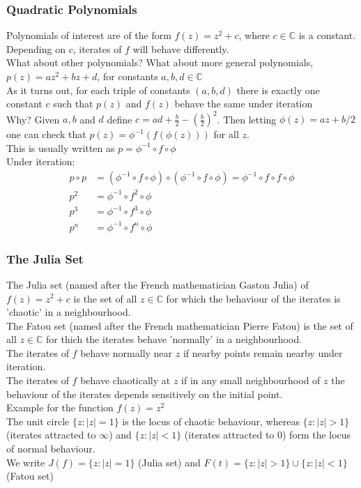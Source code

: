 \documentclass{article}
\begin{document}
\subsubsection{Quadratic Polynomials}
Polynomials of interest are of the form $f(z) = z^2 + c$, where $c \in \mathbb{C}$ is a constant. Depending on $c$, iterates of $f$ will behave differently.\\
What about other polynomials? What about more general polynomials, $p(z) = az^2 + bz + d$, for constants $a, b, d \in \mathbb{C}$\\
As it turns out, for each triple of constants $(a, b, d)$ there is exactly one constant $c$ such that $p(z)$ and $f(z)$ behave the same under iteration\\
Why? Given $a,b$ and $d$ define $c = ad + \frac{b}{2} - (\frac{b}{2})^2$. Then letting $\phi (z) = az + b/2$ one can check that $p(z) = \phi ^{-1}(f(\phi (z)))$ for all $z$.\\
This is usually written as $p = \phi ^{-1} \circ f \circ \phi$\\
Under iteration:
\begin{align*}
p \circ p &= (\phi ^{-1} \circ f \circ \phi ) \circ (\phi ^{-1} \circ f \circ \phi ) = \phi ^{-1} \circ f \circ f \circ \phi \\
p^2 & = \phi ^{-1} \circ f^2 \circ \phi \\
p^3 &= \phi ^{-1} \circ f^3 \circ \phi \\
p^n &= \phi ^{-1} \circ f^n \circ \phi
\end{align*}

\subsubsection{The Julia Set}
The Julia set (named after the French mathematician Gaston Julia) of $f(z) = z^2 + c$ is the set of all $z \in \mathbb{C}$ for which the behaviour of the iterates is 'chaotic' in a neighbourhood. \\
The Fatou set (named after the French mathematician Pierre Fatou) is the set of all $z \in \mathbb{C}$ for thich the iterates behave 'normally' in a neighbourhood. \\
The iterates of $f$ behave normally near $z$ if nearby points remain nearby under iteration. \\
The iterates of $f$ behave chaotically at $z$ if in any small neighbourhood of $z$ the behaviour of the iterates depends sensitively on the initial point. \\
Example for the function $f(z) = z^2$ \\
The unit circle $\{z : \left|z\right| = 1\}$ is the locus of chaotic behaviour, whereas $\{z : \left|z\right| > 1\}$ (iterates attracted to $\infty$) and $\{z : \left|z\right| < 1\}$ (iterates attracted to $0$) form the locus of normal behaviour.\\
We write $J(f) = \{z : \left|z\right| = 1\}$ (Julia set) and $F(t) = \{z : \left|z\right| > 1\} \cup \{z : \left|z\right| < 1\}$ (Fatou set)
\end{document}
